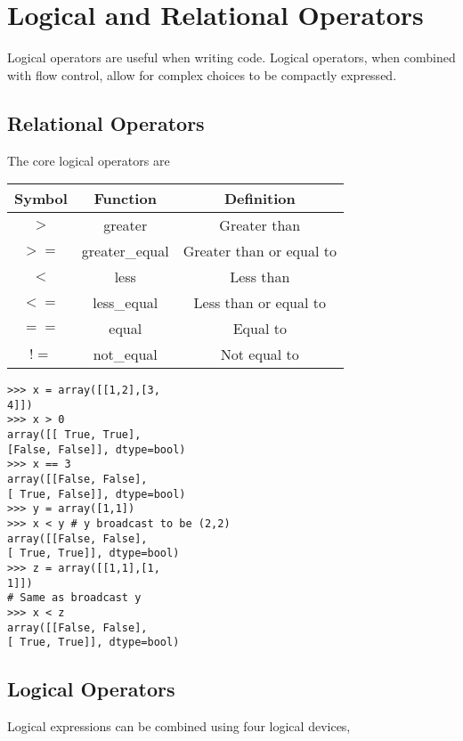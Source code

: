 \documentclass[KSmain.tex]{subfiles}
\begin{document}
 

\section{Logical and Relational Operators}
Logical operators are useful when writing code. Logical operators, when combined
with flow control, allow for complex choices to be compactly expressed.

\subsection{Relational Operators}


The core logical operators are
\begin{center}
\begin{tabular}{|c|c|c|} \hline
Symbol & Function & Definition \\ \hline
$> $     &   greater   & Greater than \\ \hline
$>=$    &  greater\_equal & Greater than or equal to \\ \hline
$< $      &  less & Less than \\ \hline
$<=$    &  less\_equal & Less than or equal to \\ \hline
$==$    &  equal & Equal to \\ \hline
$!=$      & not\_equal & Not equal to \\ \hline
\end{tabular} 
\end{center}

\begin{framed}
\begin{verbatim}
>>> x = array([[1,2],[3,
4]])
>>> x > 0
array([[ True, True],
[False, False]], dtype=bool)
>>> x == 3
array([[False, False],
[ True, False]], dtype=bool)
>>> y = array([1,1])
>>> x < y # y broadcast to be (2,2)
array([[False, False],
[ True, True]], dtype=bool)
>>> z = array([[1,1],[1,
1]])
# Same as broadcast y
>>> x < z
array([[False, False],
[ True, True]], dtype=bool)
\end{verbatim}
\end{framed}
\newpage
\subsection{Logical Operators}

Logical expressions can be combined using four logical devices,
\end{document}
